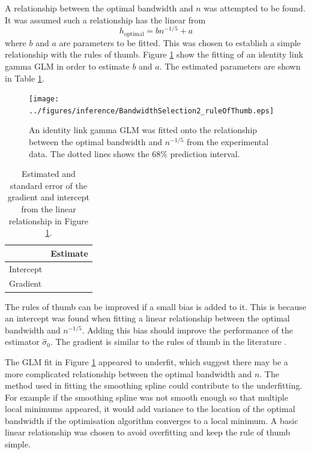 A relationship between the optimal bandwidth and $n$ was attempted to be found. It was assumed such a relationship has the linear from
\begin{equation}
  h_{\text{optimal}} = b n^{-1/5} + a
\end{equation}
where $b$ and $a$ are parameters to be fitted. This was chosen to establish a simple relationship with the rules of thumb. Figure \ref{fig:inference_BandwidthSelection2_ruleOfThumb} show the fitting of an identity link gamma GLM in order to estimate $b$ and $a$. The estimated parameters are shown in Table \ref{table:inference_BandwidthSelection2_ruleOfThumb}.

\begin{figure}
  \centering
  \texttt{[image: ../figures/inference/BandwidthSelection2\_ruleOfThumb.eps]}
  \caption{An identity link gamma GLM was fitted onto the relationship between the optimal bandwidth and $n^{-1/5}$ from the experimental data. The dotted lines shows the 68\% prediction interval.}
  \label{fig:inference_BandwidthSelection2_ruleOfThumb}
\end{figure}

\begin{table}
  \centering
  \begin{tabular}{l|l}
           &Estimate \\ \hline
  Intercept&\\
  Gradient &
  \end{tabular}
  \caption{Estimated and standard error of the gradient and intercept from the linear relationship in Figure \ref{fig:inference_BandwidthSelection2_ruleOfThumb}.}
  \label{table:inference_BandwidthSelection2_ruleOfThumb}
\end{table}

The rules of thumb can be improved if a small bias is added to it. This is because an intercept was found when fitting a linear relationship between the optimal bandwidth and $n^{-1/5}$. Adding this bias should improve the performance of the estimator $\widehat{\sigma}_0$. The gradient is similar to the rules of thumb in the literature \citep{sheather2004density}.

The GLM fit in Figure \ref{fig:inference_BandwidthSelection2_ruleOfThumb} appeared to underfit, which suggest there may be a more complicated relationship between the optimal bandwidth and $n$. The method used in fitting the smoothing spline could contribute to the underfitting. For example if the smoothing spline was not smooth enough so that multiple local minimums appeared, it would add variance to the location of the optimal bandwidth if the optimisation algorithm converges to a local minimum. A basic linear relationship was chosen to avoid overfitting and keep the rule of thumb simple.

